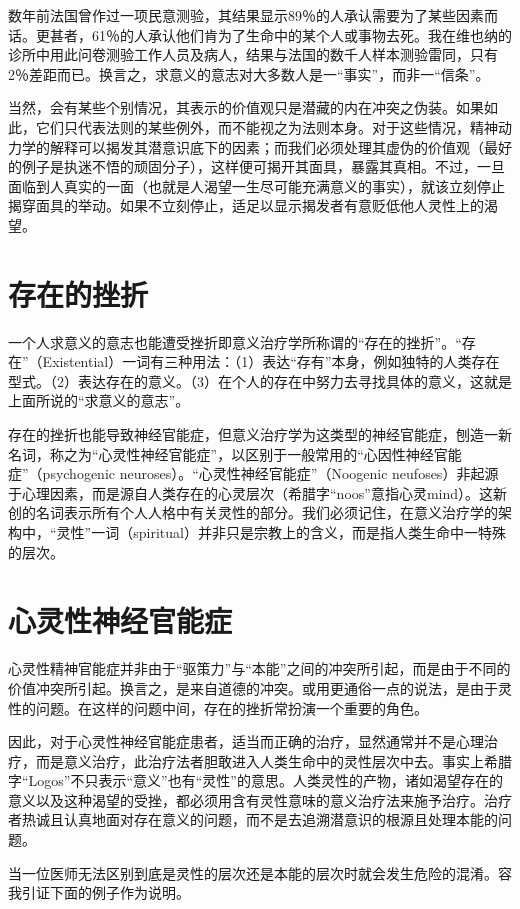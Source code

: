 \documentclass[11pt,oneside]{book}
\begin{document}
\begin{common-format}
数年前法国曾作过一项民意测验，其结果显示89％的人承认需要为了某些因素而话。更甚者，61％的人承认他们肯为了生命中的某个人或事物去死。我在维也纳的诊所中用此问卷测验工作人员及病人，结果与法国的数千人样本测验雷同，只有2％差距而已。换言之，求意义的意志对大多数人是一“事实”，而非一“信条”。

当然，会有某些个别情况，其表示的价值观只是潜藏的内在冲突之伪装。如果如此，它们只代表法则的某些例外，而不能视之为法则本身。对于这些情况，精神动力学的解释可以揭发其潜意识底下的因素；而我们必须处理其虚伪的价值观（最好的例子是执迷不悟的顽固分子），这样便可揭开其面具，暴露其真相。不过，一旦面临到人真实的一面（也就是人渴望一生尽可能充满意义的事实），就该立刻停止揭穿面具的举动。如果不立刻停止，适足以显示揭发者有意贬低他人灵性上的渴望。


\section{存在的挫折}
一个人求意义的意志也能遭受挫折即意义治疗学所称谓的“存在的挫折”。“存在”（Existential）一词有三种用法：（1）表达“存有”本身，例如独特的人类存在型式。（2）表达存在的意义。（3）在个人的存在中努力去寻找具体的意义，这就是上面所说的“求意义的意志”。

存在的挫折也能导致神经官能症，但意义治疗学为这类型的神经官能症，刨造一新名词，称之为“心灵性神经官能症”，以区别于一般常用的“心因性神经官能症”（psychogenic neuroses）。“心灵性神经官能症”（Noogenic neufoses）非起源于心理因素，而是源自人类存在的心灵层次（希腊字“noos”意指心灵mind）。这新创的名词表示所有个人人格中有关灵性的部分。我们必须记住，在意义治疗学的架构中，“灵性”一词（spiritual）并非只是宗教上的含义，而是指人类生命中一特殊的层次。


\section{心灵性神经官能症}
心灵性精神官能症并非由于“驱策力”与“本能”之间的冲突所引起，而是由于不同的价值冲突所引起。换言之，是来自道德的冲突。或用更通俗一点的说法，是由于灵性的问题。在这样的问题中间，存在的挫折常扮演一个重要的角色。

因此，对于心灵性神经官能症患者，适当而正确的治疗，显然通常并不是心理治疗，而是意义治疗，此治疗法者胆敢进入人类生命中的灵性层次中去。事实上希腊字“Logos”不只表示“意义”也有“灵性”的意思。人类灵性的产物，诸如渴望存在的意义以及这种渴望的受挫，都必须用含有灵性意味的意义治疗法来施予治疗。治疗者热诚且认真地面对存在意义的问题，而不是去追溯潜意识的根源且处理本能的问题。

当一位医师无法区别到底是灵性的层次还是本能的层次时就会发生危险的混淆。容我引证下面的例子作为说明。


\end{common-format}
\end{document}
